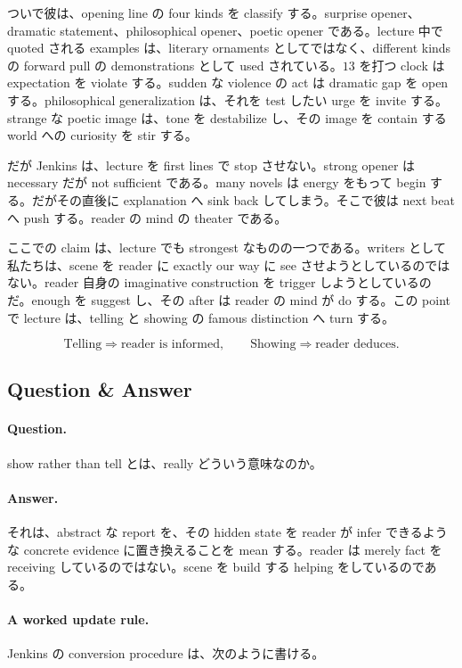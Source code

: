 ついで彼は、opening line の four kinds を classify する。surprise opener、dramatic statement、philosophical opener、poetic opener である。lecture 中で quoted される examples は、literary ornaments としてではなく、different kinds の forward pull の demonstrations として used されている。\(13\) を打つ clock は expectation を violate する。sudden な violence の act は dramatic gap を open する。philosophical generalization は、それを test したい urge を invite する。strange な poetic image は、tone を destabilize し、その image を contain する world への curiosity を stir する。

だが Jenkins は、lecture を first lines で stop させない。strong opener は necessary だが not sufficient である。many novels は energy をもって begin する。だがその直後に explanation へ sink back してしまう。そこで彼は next beat へ push する。reader の mind の theater である。

ここでの claim は、lecture でも strongest なものの一つである。writers として私たちは、scene を reader に exactly our way に see させようとしているのではない。reader 自身の imaginative construction を trigger しようとしているのだ。enough を suggest し、その after は reader の mind が do する。この point で lecture は、telling と showing の famous distinction へ turn する。

\begin{equation}
\text{Telling} \Rightarrow \text{reader is informed},\qquad
\text{Showing} \Rightarrow \text{reader deduces}.
\end{equation}

\subsection{Question \& Answer}

\paragraph{Question.} show rather than tell とは、really どういう意味なのか。

\paragraph{Answer.} それは、abstract な report を、その hidden state を reader が infer できるような concrete evidence に置き換えることを mean する。reader は merely fact を receiving しているのではない。scene を build する helping をしているのである。

\paragraph{A worked update rule.} Jenkins の conversion procedure は、次のように書ける。

